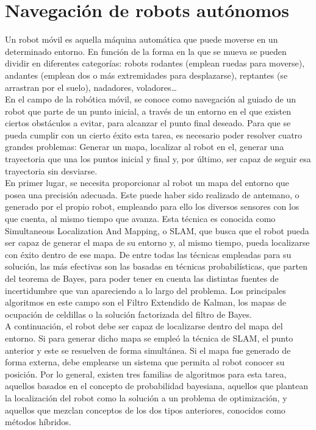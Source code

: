 \section{Navegación de robots autónomos}
\label{navegacion_de_robots}

Un robot móvil es aquella máquina automática que puede moverse en un determinado entorno. En función de la forma en la que se mueva se pueden dividir en diferentes categorías: robots rodantes (emplean ruedas para moverse), andantes (emplean dos o más extremidades para desplazarse), reptantes (se arrastran por el suelo), nadadores, voladores…\\

En el campo de la robótica móvil, se conoce como navegación al guiado de un robot que parte de un punto inicial, a través de un entorno en el que existen ciertos obstáculos a evitar, para alcanzar el punto final deseado. Para que se pueda cumplir con un cierto éxito esta tarea, es necesario poder resolver cuatro grandes problemas: Generar un mapa, localizar al robot en el, generar una trayectoria que una los puntos inicial y final y, por último, ser capaz de seguir esa trayectoria sin desviarse.\\

En primer lugar, se necesita proporcionar al robot un mapa del entorno que posea una precisión adecuada. Este puede haber sido realizado de antemano, o generado por el propio robot, empleando para ello los diversos sensores con los que cuenta, al mismo tiempo que avanza. Esta técnica es conocida como Simultaneous Localization And Mapping, o SLAM, que busca que el robot pueda ser capaz de generar el mapa de su entorno y, al mismo tiempo,  pueda localizarse con éxito dentro de ese mapa. De entre todas las técnicas empleadas para su solución, las más efectivas son las basadas en técnicas probabilísticas, que parten del teorema de Bayes, para poder tener en cuenta las distintas fuentes de incertidumbre que van apareciendo a lo largo del problema. Los principales algoritmos en este campo son el Filtro Extendido de Kalman, los mapas de ocupación de celdillas o la solución factorizada del filtro de Bayes.\\

A continuación, el robot debe ser capaz de localizarse dentro del mapa del entorno. Si para generar dicho mapa se empleó la técnica de SLAM, el punto anterior y este se resuelven de forma simultánea. Si el mapa fue generado de forma externa, debe emplearse un sistema que permita al robot conocer su posición. Por lo general, existen tres familias de algoritmos para esta tarea, aquellos basados en el concepto de probabilidad bayesiana, aquellos que plantean la localización del robot como la solución a un problema de optimización, y aquellos que mezclan conceptos de los dos tipos anteriores, conocidos como métodos híbridos.\\

